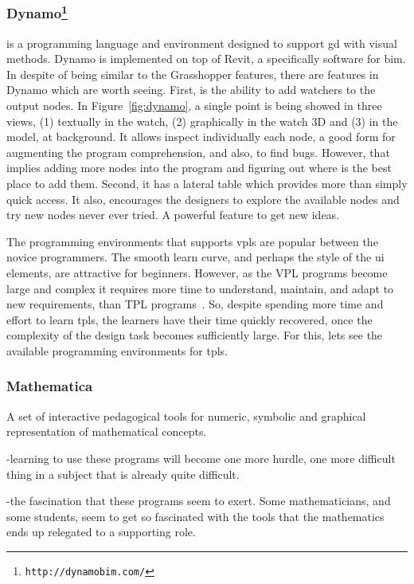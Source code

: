 \subsubsection{Dynamo\protect\footnote{\texttt{http://dynamobim.com/}}} is a programming language and environment designed to support \ac{gd} with visual methods. Dynamo is implemented on top of Revit, a specifically software for \ac{bim}. In despite of being similar to the Grasshopper features, there are features in Dynamo which are worth seeing. First, is the ability to add watchers to the output nodes. In Figure~\ref{fig:dynamo}, a single point is being showed in three views, (1) textually in the watch, (2) graphically in the watch 3D and (3) in the model, at background. It allows inspect individually each node, a good form for augmenting the program comprehension, and also, to find bugs. However, that implies adding more nodes into the program and figuring out where is the best place to add them. Second, it has a lateral table which provides more than simply quick access. It also, encourages the designers to explore the available nodes and try new nodes never ever tried. A powerful feature to get new ideas. 

The programming environments that supports \ac{vpls} are popular between the novice programmers. The smooth learn curve, and perhaps the style of the \ac{ui} elements, are attractive for beginners. However, as the {\small VPL} programs become large and complex it requires more time to understand, maintain, and adapt to new requirements, than {\small TPL} programs~\cite{leitao2011programming}. So, despite spending more time and effort to learn \ac{tpls}, the learners have their time quickly recovered, once the complexity of the design task becomes sufficiently large. For this, lets see the available programming environments for \ac{tpls}.
\subsubsection{Mathematica~\cite{wolfram1991mathematica}} A set of interactive pedagogical tools for numeric, symbolic and graphical representation of mathematical concepts.

-learning to use these programs will become one more hurdle, one more difficult thing in a subject that is already quite difficult.

-the fascination that these programs seem to exert. Some mathematicians, and some students, seem to get so fascinated with the tools that the mathematics ends up relegated to a supporting role.


